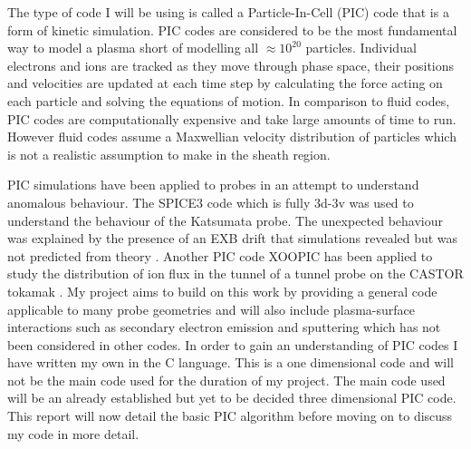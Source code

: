 \documentclass[12pt]{article}
\begin{document}
The type of code I will be using is called a Particle-In-Cell (PIC) code that is a form of kinetic simulation. PIC codes are considered to be the most fundamental way to model a plasma short of modelling all $\approx 10^{20}$ particles. Individual electrons and ions are tracked as they move through phase space, their positions and velocities are updated at each time step by calculating the force acting on each particle and solving the equations of motion. In comparison to fluid codes, PIC codes are computationally expensive  and take large amounts of time to run. However fluid codes assume a Maxwellian velocity distribution of particles which is not a realistic assumption to make in the sheath region.

PIC simulations have been applied to probes in an attempt to understand anomalous behaviour. The SPICE3 code which is fully 3d-3v was used to understand the behaviour of the Katsumata probe. The unexpected behaviour was explained by the presence of an EXB drift that simulations revealed but was not predicted from theory \cite{SPICE3}. Another PIC code XOOPIC has been applied to study the distribution of ion flux in the tunnel of a tunnel probe on the CASTOR tokamak \cite{CASTOR}. My project aims to build on this work by providing a general code applicable to many probe geometries and will also include plasma-surface interactions such as secondary electron emission and sputtering which has not been considered in other codes. In order to gain an understanding of PIC codes I have written my own in the C language. This is a one dimensional code and will not be the main code used for the duration of my project. The main code used will be an already established but yet to be decided three dimensional PIC code. This report will now detail the basic PIC algorithm before moving on to discuss my code in more detail.
\end{document}
